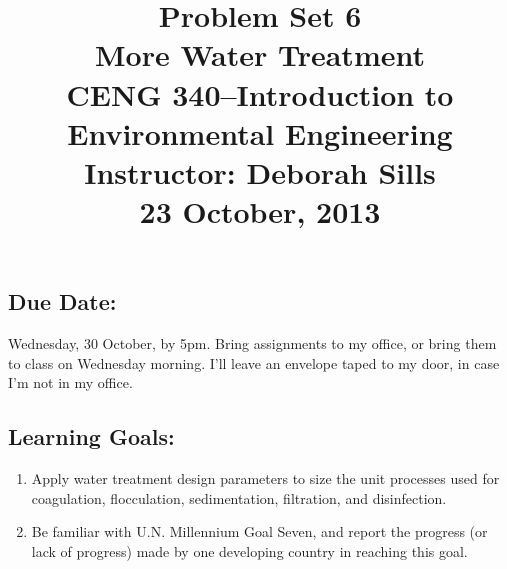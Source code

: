 \documentclass[11pt,letterpaper]{article}
\begin{document}
\setlength{\parindent}{0cm} 



\frenchspacing

\setlength{\textwidth}{6.25in}

\title {\Large{\textbf{Problem Set 6}}\\ \large{More Water Treatment\\CENG 340--Introduction to Environmental Engineering\\
Instructor: Deborah Sills\\ \textbf{23 October, 2013}}}

\author {}
\date {}
\maketitle

\vspace{-2cm}

\subsection *{Due Date:} Wednesday, 30 October, by 5pm.  Bring assignments to my office, or bring them to class on Wednesday morning.  I'll leave an envelope taped to my door, in case I'm not in my office.

\subsection *{Learning Goals:}
\begin{enumerate}
\item Apply water treatment design parameters to size the unit processes used for coagulation, flocculation, sedimentation, filtration, and disinfection.

\item Be familiar with U.N. Millennium Goal Seven, and report the progress (or lack of progress) made by one developing country in reaching this goal.
\end{enumerate}
\end{document}
